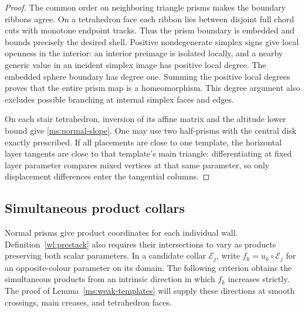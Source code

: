 \documentclass[11pt]{article}
\numberwithin{equation}{section}
\theoremstyle{definition}
\theoremstyle{remark}
\begin{document}
\begin{proof}
The common order on neighboring triangle prisms makes the boundary
ribbons agree.  On a tetrahedron face each ribbon lies between
disjoint full chord cuts with monotone endpoint tracks.  Thus the
prism boundary is embedded and bounds precisely the desired shell.
Positive nondegenerate simplex signs give local openness in the
interior: an interior preimage is isolated locally, and a nearby
generic value in an incident simplex image has positive local
degree.  The embedded sphere boundary has degree one.  Summing
the positive local degrees proves that the entire prism map is a
homeomorphism.  This degree argument also excludes possible
branching at internal simplex faces and edges.

On each stair tetrahedron, inversion of its affine matrix and the
altitude lower bound give \eqref{ms:normal-slope}.  One may use two
half-prisms with the central disk exactly prescribed.  If all
placements are close to one template, the horizontal layer
tangents are close to that template's main triangle: differentiating
at fixed layer parameter compares mixed vertices at that same
parameter, so only displacement differences enter the tangential
columns.
\end{proof}

\subsection{Simultaneous product collars}

Normal prisms give product coordinates for each individual wall.
Definition~\ref{wl:prestack} also requires their intersections to vary
as products preserving both scalar parameters.  In a candidate collar
$\mathcal E_j$, write $f_k=u_k\circ\mathcal E_j$ for an
opposite-colour parameter on its domain.  The following criterion
obtains the simultaneous products from an intrinsic direction in which
$f_k$ increases strictly.  The proof of Lemma~\ref{ms:weak-templates}
will supply these directions at smooth crossings, main creases, and
tetrahedron faces.
\end{document}
